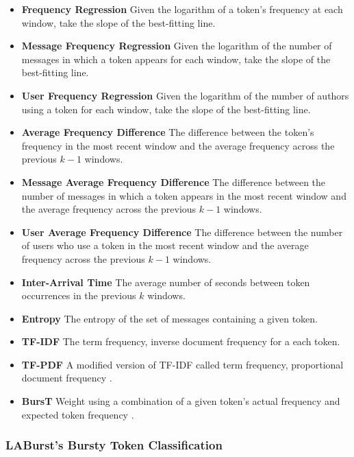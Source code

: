 \documentclass[letterpaper]{article}
\begin{document}
\begin{itemize}
\item \textbf{Frequency Regression} Given the logarithm of a token's frequency at each window, take the slope of the best-fitting line.
\item \textbf{Message Frequency Regression} Given the logarithm of the number of messages in which a token appears for each window, take the slope of the best-fitting line.
\item \textbf{User Frequency Regression} Given the logarithm of the number of authors using a token for each window, take the slope of the best-fitting line.
\item \textbf{Average Frequency Difference} The difference between the token's frequency in the most recent window and the average frequency across the previous $k -1$ windows.
\item \textbf{Message Average Frequency Difference} The difference between the number of messages in which a token appears in the most recent window and the average frequency across the previous $k -1$ windows.
\item \textbf{User Average Frequency Difference} The difference between the number of users who use a token in the most recent window and the average frequency across the previous $k -1$ windows.
\item \textbf{Inter-Arrival Time} The average number of seconds between token occurrences in the previous $k$ windows.
\item \textbf{Entropy} The entropy of the set of messages containing a given token.
\item \textbf{TF-IDF} The term frequency, inverse document frequency for a each token.
\item \textbf{TF-PDF} A modified version of TF-IDF called term frequency, proportional document frequency \cite{Bun:2002:TEN:645962.674082}.
\item \textbf{BursT} Weight using a combination of a given token's actual frequency and expected token frequency \cite{Lee:2011:BDT:2009463.2009531}.
\end{itemize}

\subsubsection{LABurst's Bursty Token Classification}
\end{document}
